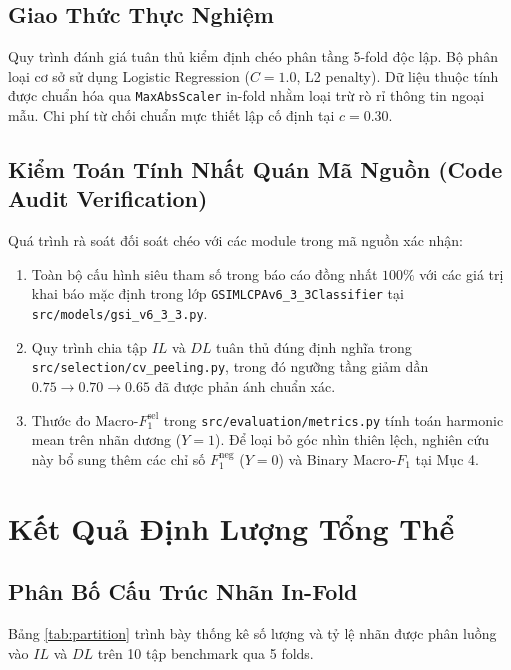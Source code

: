\documentclass[10pt,a4paper]{article}
\begin{document}
\subsection{Giao Thức Thực Nghiệm}
Quy trình đánh giá tuân thủ kiểm định chéo phân tầng 5-fold độc lập. Bộ phân loại cơ sở sử dụng Logistic Regression ($C=1.0$, L2 penalty). Dữ liệu thuộc tính được chuẩn hóa qua \texttt{MaxAbsScaler} in-fold nhằm loại trừ rò rỉ thông tin ngoại mẫu. Chi phí từ chối chuẩn mực thiết lập cố định tại $c = 0.30$.

\subsection{Kiểm Toán Tính Nhất Quán Mã Nguồn (Code Audit Verification)}
Quá trình rà soát đối soát chéo với các module trong mã nguồn xác nhận:
\begin{enumerate}[leftmargin=*]
    \item Toàn bộ cấu hình siêu tham số trong báo cáo đồng nhất $100\%$ với các giá trị khai báo mặc định trong lớp \texttt{GSIMLCPAv6\_3\_3Classifier} tại \texttt{src/models/gsi\_v6\_3\_3.py}.
    \item Quy trình chia tập $IL$ và $DL$ tuân thủ đúng định nghĩa trong \texttt{src/selection/cv\_peeling.py}, trong đó ngưỡng tầng giảm dần $0.75 \to 0.70 \to 0.65$ đã được phản ánh chuẩn xác.
    \item Thước đo $\text{Macro-}F_1^{\text{sel}}$ trong \texttt{src/evaluation/metrics.py} tính toán harmonic mean trên nhãn dương ($Y=1$). Để loại bỏ góc nhìn thiên lệch, nghiên cứu này bổ sung thêm các chỉ số $F_1^{\text{neg}}$ ($Y=0$) và Binary Macro-$F_1$ tại Mục 4.
\end{enumerate}

\section{Kết Quả Định Lượng Tổng Thể}

\subsection{Phân Bố Cấu Trúc Nhãn In-Fold}
Bảng \ref{tab:partition} trình bày thống kê số lượng và tỷ lệ nhãn được phân luồng vào $IL$ và $DL$ trên 10 tập benchmark qua 5 folds.
\end{document}
